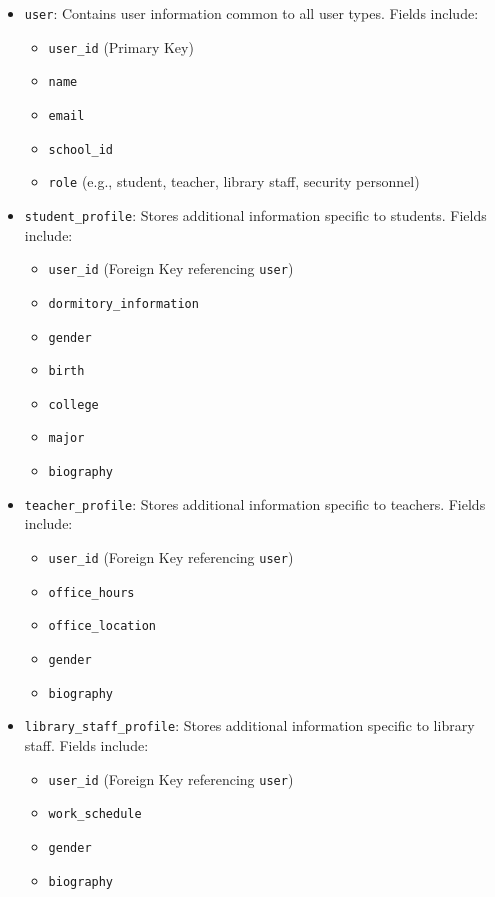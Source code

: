 \documentclass[12pt]{article}
\begin{document}
\begin{itemize}
    \item \texttt{user}: Contains user information common to all user types. Fields include:
    \begin{itemize}
        \item \texttt{user\_id} (Primary Key)
        \item \texttt{name}
        \item \texttt{email}
        \item \texttt{school\_id}
        \item \texttt{role} (e.g., student, teacher, library staff, security personnel)
    \end{itemize}

    \item \texttt{student\_profile}: Stores additional information specific to students. Fields include:
    \begin{itemize}
        \item \texttt{user\_id} (Foreign Key referencing \texttt{user})
        \item \texttt{dormitory\_information}
        \item \texttt{gender}
        \item \texttt{birth}
        \item \texttt{college}
        \item \texttt{major}
        \item \texttt{biography}
    \end{itemize}

    \item \texttt{teacher\_profile}: Stores additional information specific to teachers. Fields include:
    \begin{itemize}
        \item \texttt{user\_id} (Foreign Key referencing \texttt{user})
        \item \texttt{office\_hours}
        \item \texttt{office\_location}
        \item \texttt{gender}
        \item \texttt{biography}
    \end{itemize}

    \item \texttt{library\_staff\_profile}: Stores additional information specific to library staff. Fields include:
    \begin{itemize}
        \item \texttt{user\_id} (Foreign Key referencing \texttt{user})
        \item \texttt{work\_schedule}
        \item \texttt{gender}
        \item \texttt{biography}
    \end{itemize}


\end{itemize}
\end{document}
